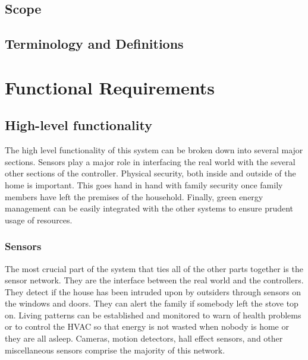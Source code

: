 \documentclass{report}
\begin{document}
\section{Scope}


\section{Terminology and Definitions}


\chapter{Functional Requirements}

\section{High-level functionality}
The high level functionality of this system can be broken down into several
major sections. Sensors play a major role in interfacing the real world with
the several other sections of the controller. Physical security, both inside
and outside of the home is important. This goes hand in hand with family
security once family members have left the premises of the household. Finally,
green energy management can be easily integrated with the other systems to
ensure prudent usage of resources. 

\subsection{Sensors}

The most crucial part of the system that ties all of the other parts together
is the sensor network. They are the interface between the real world and the
controllers. They detect if the house has been intruded upon by outsiders
through sensors on the windows and doors. They can alert the family if somebody
left the stove top on. Living patterns can be established and monitored to warn
of health problems or to control the HVAC so that energy is not wasted when
nobody is home or they are all asleep. Cameras, motion detectors, hall effect
sensors, and other miscellaneous sensors comprise the majority of this network.
\end{document}

